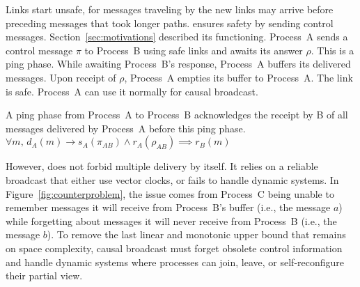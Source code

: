 Links start unsafe, for messages traveling by the new links may arrive before
preceding messages that took longer paths. \PCBROADCAST ensures safety by
sending control messages. Section~\ref{sec:motivations} described its
functioning. Process~A sends a control message $\pi$ to Process~B using safe
links and awaits its answer $\rho$. This is a ping phase. While awaiting
Process~B's response, Process~A buffers its delivered messages. Upon receipt of
$\rho$, Process~A empties its buffer to Process~A. The link is safe. Process~A
can use it normally for causal broadcast.


\begin{lemma}
  A ping phase from Process~A to Process~B acknowledges the receipt by B of all
  messages delivered by Process~A before this ping phase.
  $\forall m,\, d_A(m) \rightarrow s_A(\pi_{AB}) \wedge r_A(\rho_{AB}) \implies
  r_B(m)$
\end{lemma}

However, \PCBROADCAST does not forbid multiple delivery by itself. It relies on
a reliable broadcast that either use vector clocks, or fails to handle dynamic
systems.  In Figure~\ref{fig:counterproblem}, the issue comes from Process~C
being unable to remember messages it will receive from Process~B's buffer (i.e.,
the message $a$) while forgetting about messages it will never receive from
Process~B (i.e., the message $b$).  To remove the last linear and monotonic
upper bound that remains on space complexity, causal broadcast must forget
obsolete control information and handle dynamic systems where processes can
join, leave, or self-reconfigure their partial view.


